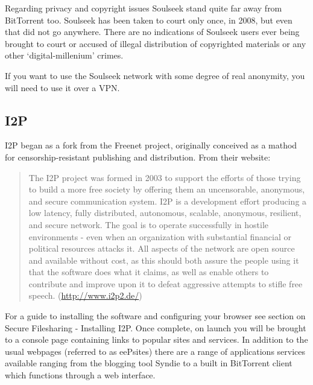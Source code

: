 Regarding privacy and copyright issues Soulseek stand quite far away
from BitTorrent too. Soulseek has been taken to court only once, in
2008, but even that did not go anywhere. There are no indications of
Soulseek users ever being brought to court or accused of illegal
distribution of copyrighted materials or any other `digital-millenium'
crimes.

If you want to use the Soulseek network with some degree of real
anonymity, you will need to use it over a VPN.

\subsection{I2P}

I2P began as a fork from the Freenet project, originally conceived as a
mathod for censorship-resistant publishing and distribution. From their
website:

\begin{quote}
The I2P project was formed in 2003 to support the efforts of those
trying to build a more free society by offering them an uncensorable,
anonymous, and secure communication system. I2P is a development effort
producing a low latency, fully distributed, autonomous, scalable,
anonymous, resilient, and secure network. The goal is to operate
successfully in hostile environments - even when an organization with
substantial financial or political resources attacks it. All aspects of
the network are open source and available without cost, as this should
both assure the people using it that the software does what it claims,
as well as enable others to contribute and improve upon it to defeat
aggressive attempts to stifle free speech.
(\href{http://www.i2p2.de/}{http://www.i2p2.de/})

\end{quote}
For a guide to installing the software and configuring your browser see
section on Secure Filesharing - Installing I2P. Once complete, on launch
you will be brought to a console page containing links to popular sites
and services. In addition to the usual webpages (referred to as
eePsites) there are a range of applications services available ranging
from the blogging tool Syndie to a built in BitTorrent client which
functions through a web interface.
